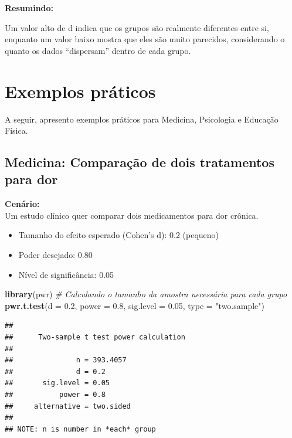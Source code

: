 \documentclass[
]{book}
\newenvironment{Shaded}{\begin{snugshade}}{\end{snugshade}}
\newcommand{\AttributeTok}[1]{\textcolor[rgb]{0.13,0.29,0.53}{#1}}
\newcommand{\CommentTok}[1]{\textcolor[rgb]{0.56,0.35,0.01}{\textit{#1}}}
\newcommand{\FloatTok}[1]{\textcolor[rgb]{0.00,0.00,0.81}{#1}}
\newcommand{\FunctionTok}[1]{\textcolor[rgb]{0.13,0.29,0.53}{\textbf{#1}}}
\newcommand{\NormalTok}[1]{#1}
\newcommand{\StringTok}[1]{\textcolor[rgb]{0.31,0.60,0.02}{#1}}
\providecommand{\tightlist}{%
  \setlength{\itemsep}{0pt}\setlength{\parskip}{0pt}}
\begin{document}
\textbf{Resumindo:}

Um valor alto de d indica que os grupos são realmente diferentes entre si, enquanto um valor baixo mostra que eles são muito parecidos, considerando o quanto os dados ``dispersam'' dentro de cada grupo.

\section{Exemplos práticos}\label{exemplos-pruxe1ticos}

A seguir, apresento exemplos práticos para Medicina, Psicologia e Educação Física.

\subsection{Medicina: Comparação de dois tratamentos para dor}\label{medicina-comparauxe7uxe3o-de-dois-tratamentos-para-dor}

\textbf{Cenário:}\\
Um estudo clínico quer comparar dois medicamentos para dor crônica.

\begin{itemize}
\tightlist
\item
  Tamanho do efeito esperado (Cohen's d): 0.2 (pequeno)\\
\item
  Poder desejado: 0.80\\
\item
  Nível de significância: 0.05
\end{itemize}

\begin{Shaded}
\begin{Highlighting}[]
\FunctionTok{library}\NormalTok{(pwr)}
\CommentTok{\# Calculando o tamanho da amostra necessária para cada grupo}
\FunctionTok{pwr.t.test}\NormalTok{(}\AttributeTok{d =} \FloatTok{0.2}\NormalTok{, }\AttributeTok{power =} \FloatTok{0.8}\NormalTok{, }\AttributeTok{sig.level =} \FloatTok{0.05}\NormalTok{, }\AttributeTok{type =} \StringTok{"two.sample"}\NormalTok{)}
\end{Highlighting}
\end{Shaded}

\begin{verbatim}
## 
##      Two-sample t test power calculation 
## 
##               n = 393.4057
##               d = 0.2
##       sig.level = 0.05
##           power = 0.8
##     alternative = two.sided
## 
## NOTE: n is number in *each* group
\end{verbatim}
\end{document}
